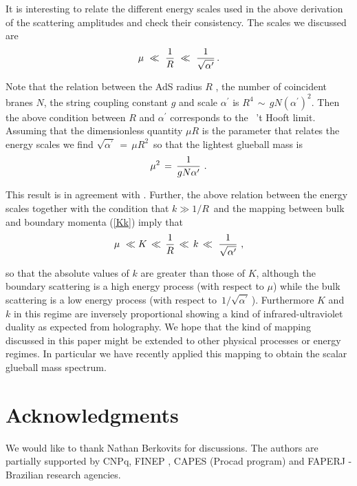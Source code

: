 \documentclass[a4paper,twocolumn,prd,groupedaddress,nofootinbib]{revtex4}
\begin{document}
It is interesting to relate the different energy scales used in the above
derivation of the scattering amplitudes and check their consistency. 
The scales we discussed are 
\begin{equation}
\mu \,\,\ll \,\,{1\over R}\,\,\ll\,\, {1\over \sqrt{\alpha^\prime}}\,.
\end{equation}

\noindent Note that the relation between the AdS radius $R$ , the number of
coincident branes $N$, the string coupling constant $g$ and scale $\alpha^\prime$
is $R^4 \,\sim \, g N ( \alpha^\prime )^2$.
Then the above condition between $R$ and $\alpha^\prime$ corresponds
to the $\,$ 't Hooft limit\cite{Planar}.
Assuming that the dimensionless quantity $\mu R$ is the parameter
that relates the energy scales we find $ \sqrt{\alpha^\prime}\,=\,\mu R^2 \,$
so that the lightest glueball mass is
\begin{equation}
\mu^2 \,=\,{1\over g N \alpha^\prime}\,\,.
\end{equation}

\noindent  This result is in agreement with \cite{MN}. Further,  the 
above relation between the energy scales together with the condition that $k \gg 1/R\,$
and the mapping between bulk and boundary momenta (\ref{Kk}) imply that
\begin{equation}
\mu \,\,\ll K \,\ll \,{1\over R}\,\ll\,k\,\ll\,\, {1\over \sqrt{\alpha^\prime}}\,\,,
\end{equation}

\noindent so that the absolute values of $k$ are greater than those of $K$,
although the boundary scattering is a high energy process
(with respect to $\mu$) while the bulk scattering is a low  energy
process (with respect to $\,1/\sqrt{\alpha^\prime}\,$).
Furthermore  $K$ and $k$ in this regime are inversely proportional
showing a kind of infrared-ultraviolet duality as expected from  holography.
We hope that the kind of mapping discussed in this paper might 
be extended to other physical processes or energy regimes.
In particular we have recently applied this mapping to obtain the scalar 
glueball mass spectrum\cite{BB3}.


\section*{Acknowledgments}
We would like to thank Nathan Berkovits for discussions. 
The authors are partially supported by CNPq, FINEP , 
CAPES (Procad program) and FAPERJ 
- Brazilian research agencies. 
\end{document}
